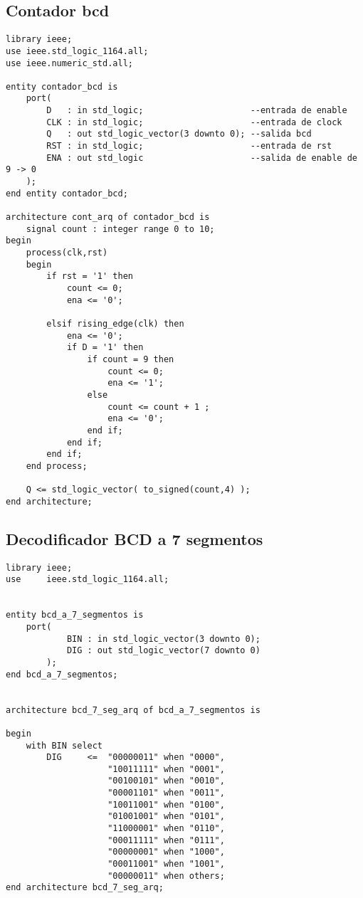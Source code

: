 \documentclass[10pt,a4paper]{article}
\begin{document}
\subsection*{Contador bcd}
\begin{center}
\begin{verbatim}
library ieee;
use ieee.std_logic_1164.all;
use ieee.numeric_std.all;

entity contador_bcd is
    port(
        D   : in std_logic;                     --entrada de enable
        CLK : in std_logic;                     --entrada de clock
        Q   : out std_logic_vector(3 downto 0); --salida bcd
        RST : in std_logic;                     --entrada de rst
        ENA : out std_logic                     --salida de enable de 9 -> 0
    );
end entity contador_bcd;

architecture cont_arq of contador_bcd is
    signal count : integer range 0 to 10;
begin
    process(clk,rst)
    begin
        if rst = '1' then
            count <= 0;
            ena <= '0';

        elsif rising_edge(clk) then
            ena <= '0';
            if D = '1' then
                if count = 9 then
                    count <= 0;
                    ena <= '1';
                else
                    count <= count + 1 ;
                    ena <= '0';
                end if;
            end if;
        end if;
    end process;
    
    Q <= std_logic_vector( to_signed(count,4) );
end architecture;
\end{verbatim}
\end{center}
\newpage
\subsection*{Decodificador BCD a 7 segmentos}
\begin{center}
\begin{verbatim}
library ieee;
use     ieee.std_logic_1164.all;


entity bcd_a_7_segmentos is
    port(
            BIN : in std_logic_vector(3 downto 0);
            DIG : out std_logic_vector(7 downto 0)
        );
end bcd_a_7_segmentos;


architecture bcd_7_seg_arq of bcd_a_7_segmentos is

begin
    with BIN select
        DIG     <=  "00000011" when "0000",
                    "10011111" when "0001",
                    "00100101" when "0010",
                    "00001101" when "0011",
                    "10011001" when "0100",
                    "01001001" when "0101",
                    "11000001" when "0110",
                    "00011111" when "0111",
                    "00000001" when "1000",
                    "00011001" when "1001",
                    "00000011" when others;
end architecture bcd_7_seg_arq;
\end{verbatim}
\end{center}
\end{document}
